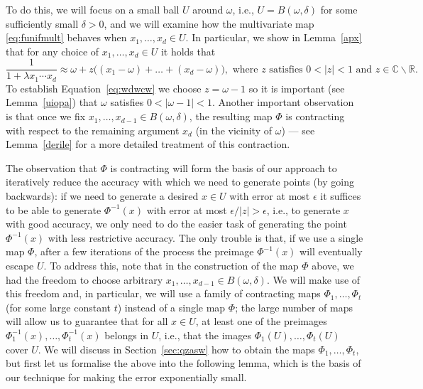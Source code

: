 \documentclass[11pt]{article}
\def\Reals{\mathbb{R}}
\def\Complex{\mathbb{C}}
\begin{document}
To do this, we will focus on a small ball $U$ around $\omega$, i.e.,  $U=B(\omega,\delta)$ for some sufficiently small $\delta>0$,  and we will examine how the multivariate map \eqref{eq:funifmult} behaves when $x_1,\hdots,x_d\in U$.  In particular, we show in Lemma~\ref{apx} that for any choice of $x_1,\hdots,x_d\in U$ it holds that 
\begin{equation}\label{eq:wdwcw}
\frac{1}{1+\lambda x_1\cdots x_d }\approx\omega+z\Big((x_1-\omega)+\hdots+(x_d-\omega)\Big), \mbox{ where $z$ satisfies $0<|z|<1$ and $z\in \Complex\backslash\Reals$.}
\end{equation}
To establish Equation~\eqref{eq:wdwcw} we choose $z=\omega-1$
so it is important (see Lemma~\ref{uiopa}) that 
$\omega$ satisfies $0<|\omega-1| < 1$.
Another important observation is that once we fix $x_1,\hdots,x_{d-1}\in B(\omega,\delta)$, the resulting map $\Phi$ is contracting with respect to the remaining argument $x_d$ (in the vicinity of $\omega$) --- see Lemma~\ref{derile} for a more detailed  treatment of this contraction.

The observation 
that $\Phi$ is contracting
will form the basis of our approach to iteratively reduce the accuracy with which we need to generate points (by going backwards): if we need to generate a desired $x\in U$ with error at most $\epsilon$ it suffices to be able to generate $\Phi^{-1}(x)$ with error at most $\epsilon/|z|>\epsilon$, i.e., to generate $x$ with  good accuracy, we only need to do the easier task of generating the point $\Phi^{-1}(x)$ with  
less restrictive accuracy.  The only trouble is that, if we use a single map $\Phi$, after a few iterations of the process the preimage $\Phi^{-1}(x)$ will eventually escape $U$. To address this, note that in the construction of the map $\Phi$ above, we had the freedom to choose arbitrary $x_1,\hdots,x_{d-1}\in B(\omega,\delta)$. We will make use of this freedom and, in particular, we will use a family of contracting maps $\Phi_1,\hdots,\Phi_t$ (for some large constant $t$) instead of a single map $\Phi$; the large number of maps will allow us to guarantee that for all $x\in U$, at least one of the preimages $\Phi_1^{-1}(x),\hdots, \Phi_t^{-1}(x)$ belongs in $U$, i.e., that the images $\Phi_1(U),\hdots, \Phi_t(U)$ cover $U$. We will discuss  in Section~\ref{sec:qzasw} how to obtain the maps $\Phi_1,\hdots, \Phi_t$,  but first let us formalise the above into the following lemma, which is the basis of our technique for making the error exponentially small. 
\end{document}
